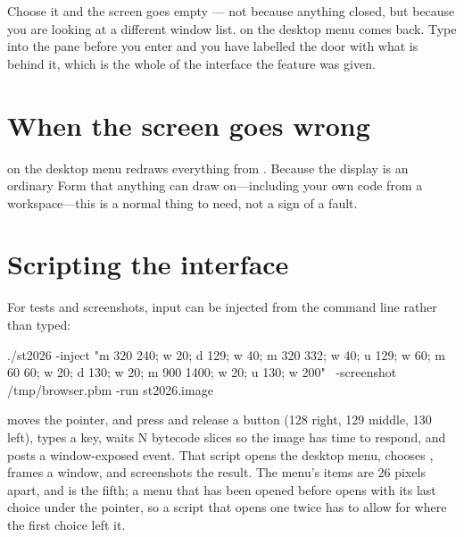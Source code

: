 Choose it and the screen goes empty --- not because anything closed, but
because you are looking at a different window list.  on the
desktop menu comes back. Type into the pane before you enter and you have
labelled the door with what is behind it, which is the whole of the interface
the feature was given.

\section{When the screen goes wrong}

 on the desktop menu redraws everything from
. Because the display is an ordinary Form that
anything can draw on---including your own code from a workspace---this is a
normal thing to need, not a sign of a fault.

\section{Scripting the interface}

For tests and screenshots, input can be injected from the command line rather
than typed:

\begin{sh}
./st2026 -inject "m 320 240; w 20; d 129; w 40; m 320 332; w 40; u 129; w 60;
                m 60 60; w 20; d 130; w 20; m 900 1400; w 20; u 130; w 200" \
       -screenshot /tmp/browser.pbm -run st2026.image
\end{sh}

 moves the pointer,  and  press and release a button
(128 right, 129 middle, 130 left), \ct{k} types a key, \ct{w N} waits N bytecode
slices so the image has time to respond, and \ct{x} posts a window-exposed
event. That script opens the desktop menu, chooses , frames a
window, and screenshots the result. The menu's items are 26 pixels apart,
and \ct{browser} is the fifth; a menu that has been opened before opens with
its last choice under the pointer, so a script that opens one twice has to
allow for where the first choice left it.
